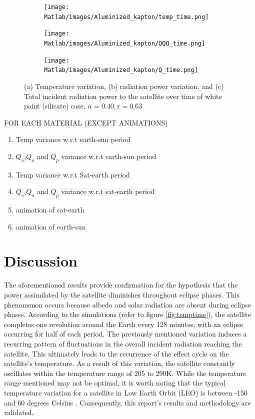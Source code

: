 \documentclass[11pt]{article}
\begin{document}
\begin{figure}[H]
    \centering
    \begin{subfigure}[b]{1\textwidth}
        \texttt{[image: Matlab/images/Aluminized\_kapton/temp\_time.png]}
        \caption{}
        \label{fig:temptime2}
    \end{subfigure}
    \begin{subfigure}[b]{1\textwidth}
        \texttt{[image: Matlab/images/Aluminized\_kapton/QQQ\_time.png]}
        \caption{}
        \label{fig:QQQtimme2}
    \end{subfigure}
    \begin{subfigure}[b]{1\textwidth}
        \texttt{[image: Matlab/images/Aluminized\_kapton/Q\_time.png]}
        \caption{}
        \label{fig:Qtime2}
    \end{subfigure}
    \caption{(a) Temperature variation, (b) radiation power variation, and (c) Total incident radiation power to the satellite over time of white paint (silicate) case, $\alpha=0.40, \varepsilon =0.63 $}
\end{figure}







 
FOR EACH MATERIAL (EXCEPT ANIMATIONS)
\begin{enumerate}
    \item Temp variance w.r.t earth-sun period
    \item $Q_{s}$,$Q_{a}$ and $Q_{p}$ variance w.r.t earth-sun period
    \item Temp variance w.r.t Sat-earth period
    \item $Q_{s}$,$Q_{a}$ and $Q_{p}$ variance w.r.t sat-earth period
    \item animation of sat-earth
    \item animation of earth-sun 


\end{enumerate}


\newpage
\section{Discussion} %
\indent The aforementioned results provide confirmation for the hypothesis that the power assimilated by the satellite diminishes throughout eclipse phases. This phenomenon occurs because albedo and solar radiation are absent during eclipse phases. According to the simulations (refer to figure \ref{fig:temptime}), the satellite completes one revolution around the Earth every 128 minutes, with an eclipse occurring for half of each period. The previously mentioned variation induces a recurring pattern of fluctuations in the overall incident radiation reaching the satellite. This ultimately leads to the recurrence of the effect cycle on the satellite's temperature. As a result of this variation, the satellite constantly oscillates within the temperature range of 205 to 290K. While the temperature range mentioned may not be optimal, it is worth noting that the typical temperature variation for a satellite in Low Earth Orbit (LEO) is between -150 and 60 degrees Celsius \cite{iles2004photovoltaic}. Consequently, this report's results and methodology are validated.
\end{document}
